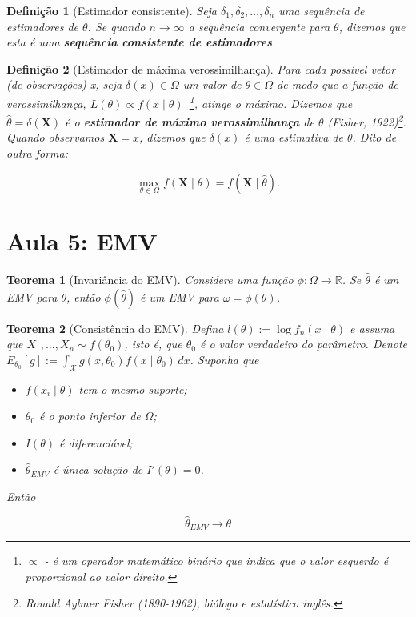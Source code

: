 \documentclass{article}
\newtheorem{theorem}{Teorema}
\newtheorem{definition}{Definição}
\begin{document}
	\begin{definition}[Estimador consistente]
		Seja $\delta_1, \delta_2, \ldots, \delta_n$ uma sequência de estimadores de $\theta$. Se quando $n \rightarrow \infty$ a sequência convergente para $\theta$, dizemos que esta é uma \textbf{sequência consistente de estimadores}.
	\end{definition}
	
	\begin{definition}[Estimador de máxima verossimilhança]
		Para cada possível vetor (de observações) x, seja $\delta(x) \in \Omega$ um valor de $\theta \in \Omega$ de modo que a função de verossimilhança, $L(\theta) \propto f(x \mid \theta)$~\footnote{$\propto$ - é um operador matemático binário que indica que o valor esquerdo é proporcional ao valor direito.}, atinge o máximo.
		Dizemos que $\hat\theta = \delta(\textbf{X})$ é o \textbf{estimador de máximo verossimilhança} de $\theta$ (Fisher, 1922)\footnote{Ronald Aylmer Fisher (1890-1962), biólogo e estatístico inglês.}. Quando observamos $\textbf{X} = x$, dizemos que $\delta(x)$ é uma estimativa de $\theta$. Dito de outra forma:
		
		\begin{equation}
			\max_{\theta \in \Omega} f(\textbf{X} \mid \theta) = f(\textbf{X} \mid \hat\theta).
		\end{equation}
	\end{definition}
	
	
	\section*{Aula 5: EMV}
	\label{s5}
	\begin{theorem}[Invariância do EMV]
		Considere uma função $\phi: \Omega \rightarrow \mathbb{R}$. Se $\hat{\theta}$ é um EMV para $\theta$, então $\phi(\hat{\theta})$ é um EMV para $\omega = \phi(\theta)$.
	\end{theorem}
	
	\begin{theorem}[Consistência do EMV]
		Defina $l(\theta) := \log f_n(x \mid \theta)$ e assuma que $X_1, \ldots, X_n \sim f(\theta_0)$, isto é, que $\theta_0$ é o valor verdadeiro do parâmetro.
		Denote $E_{\theta_0}[g] := \int_{\mathcal{X}} g(x, \theta_0) f(x \mid \theta_0)\, dx$. Suponha que
		
		\begin{itemize}
			\item $f(x_i \mid \theta)$ tem o mesmo suporte;
			\item $\theta_0$ é o ponto inferior de $\Omega$;
			\item $I(\theta)$ é diferenciável;
			\item $\hat{\theta}_{EMV}$ é única solução de $I'(\theta) = 0$.
		\end{itemize}
		
		Então
		
		$$\hat{\theta}_{EMV} \rightarrow \theta$$
		
	\end{theorem}
	
\end{document}
